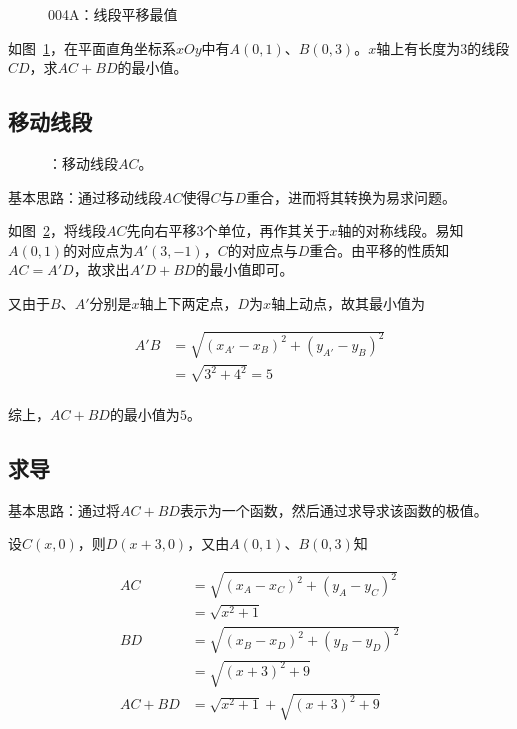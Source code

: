 

\begin{figure}
  \centering
  \caption{004A：线段平移最值} \label{fig:004A}
\end{figure}

如图~\ref{fig:004A}，在平面直角坐标系$xOy$中有$A(0, 1)$、$B(0, 3)$。$x$轴上有长度为$3$的线段$CD$，求$AC + BD$的最小值。


\subsection{移动线段} \label{subsec:004A-mv}

\begin{figure}
  \centering
  \caption{：移动线段$AC$。} \label{fig:004A-mv}
\end{figure}

基本思路：通过移动线段$AC$使得$C$与$D$重合，进而将其转换为易求问题。

如图~\ref{fig:004A-mv}，将线段$AC$先向右平移$3$个单位，再作其关于$x$轴的对称线段。易知$A(0, 1)$的对应点为$A'(3, -1)$，$C$的对应点与$D$重合。由平移的性质知$AC = A'D$，故求出$A'D + BD$的最小值即可。

又由于$B$、$A'$分别是$x$轴上下两定点，$D$为$x$轴上动点，故其最小值为

\begin{align*}
  A'B &= \sqrt{(x_{A'} - x_B)^2 + (y_{A'} - y_B)^2} \\
  &= \sqrt{3^2 + 4^2} = 5 \\
\end{align*}

综上，$AC + BD$的最小值为$5$。

\subsection{求导}

基本思路：通过将$AC + BD$表示为一个函数，然后通过求导求该函数的极值。

设$C(x, 0)$，则$D(x + 3, 0)$，又由$A(0, 1)$、$B(0, 3)$知

\begin{align*}
  AC &= \sqrt{(x_A - x_C)^2 + (y_A - y_C)^2} \\
  &= \sqrt{x^2 + 1} \\
  BD &= \sqrt{(x_B - x_D)^2 + (y_B - y_D)^2} \\
  &= \sqrt{(x + 3)^2 + 9} \\
  AC + BD &= \sqrt{x^2 + 1} + \sqrt{(x + 3)^2 + 9} \\
\end{align*}

